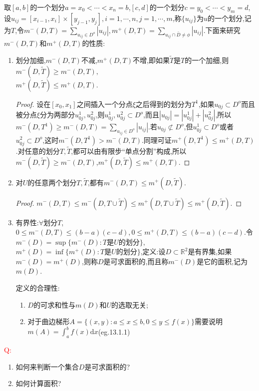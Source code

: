 \documentclass[UTF8]{ctexart}
\renewcommand{\d}{\mathrm{d}}
\begin{document}
    取$[a,b]$的一个划分$a=x_0<\cdots<x_n=b$,$[c,d]$的一个划分$c=y_0<\cdots<y_m=d$,设$u_{ij}=[x_{i-1},x_i]\times[y_{j-1},y_j],i=1,\cdots,n,j=1,\cdots,m$,称$\{u_{ij}\}$为$u$的一个划分,记为$T$,令$m^-(D,T)=\sum_{u_{ij}\in D^o}|u_{ij}|,m^+(D,T)=\sum_{u_{ij}\cap\bar{D}\not=\phi}|u_{ij}|$.下面来研究$m^-(D,T)$和$m^+(D,T)$的性质:
    \begin{enumerate}[1)]
        \item 划分加细,$m^-(D,T)$不减,$m^+(D,T)$不增,即如果$\tilde{T}$是$T$的一个加细,则$m^-(D,\tilde{T})\ge m^-(D,T),$\\$m^+(D,\tilde{T})\le m^+(D,T)$.
        \begin{proof}
            设在$[x_0,x_1]$之间插入一个分点$\xi$之后得到的划分为$T^1$,如果$u_{0j}\subset D^o$而且被分点$\xi$分为两部分$u^1_{0j},u^2_{0j}$,则$u^1_{0j},u^2_{0j}\subset D^o$,而且$|u_{0j}|=|u^1_{0j}|+|u^2_{0j}|$,所以$m^-(D,T^1)\ge m^-(D,T)=\sum_{u_{ij}\in D^o}|u_{ij}|$.若$u_{0j}\not\subset D^o$,但$u^1_{0j}\subset D^o$或者$u^2_{0j}\subset D^o$,这时$m^-(D,T^1)> m^-(D,T)$.同理可证$m^+(D,T^1)\le m^+(D,T)$.对任意的划分$T,\tilde{T}$,都可以由有限步``单点分割''构成,所以$m^-(D,\tilde{T})\ge m^-(D,T)$,$m^+(D,\tilde{T})\le m^+(D,T)$.
        \end{proof}
        \item 对$U$的任意两个划分$T,\tilde{T}$,都有$m^-(D,T)\le m^+(D,\tilde{T})$.
        \begin{proof}
            $m^-(D,T)\le m^-(D,T\cup\tilde{T})\le m^+(D,T\cup\tilde{T}) \le m^+(D,\tilde{T})$.
        \end{proof}
        \item 有界性:$\forall$划分$T$,$0\le m^-(D,T)\le (b-a)(c-d),0\le m^+(D,T)\le (b-a)(c-d)$.令$m^-(D)=\sup\{m^-(D):T\text{是}U\text{的划分}\}$,$m^+(D)=\inf\{m^+(D):T\text{是}U\text{的划分}\}$,定义:设$D\subset\mathbb{R}^2$是有界集,如果$m^-(D)=m^+(D)$,则称$D$是可求面积的,而且称$m^-(D)$是它的面积,记为$m(D)$.
        
        定义的合理性:\begin{enumerate}
            \item $D$的可求和性与$m(D)$和$U$的选取无关;
            \item 对于曲边梯形$A=\{(x,y):a\le x\le b,0\le y\le f(x)\}$需要说明$m(A)=\int_a^bf(x)\d x$(eg.13.1.1)
        \end{enumerate}
    \end{enumerate}

    \textcolor{red}{Q:}\begin{enumerate}
        \item 如何来判断一个集合$D$是可求面积的?
        \item 如何计算面积?
    \end{enumerate}
\end{document}
